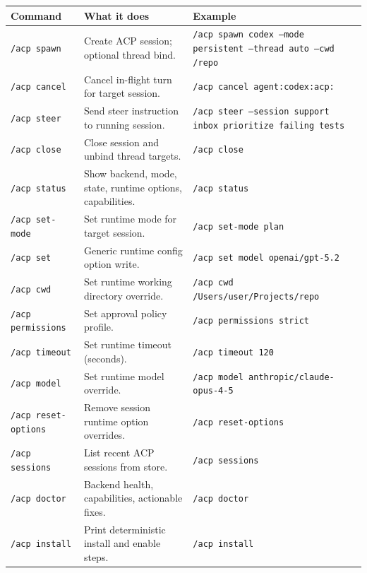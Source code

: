 \begin{table}[h]
\centering
\small
\begin{tabular}{|l|l|l|}
\hline
Command & What it does & Example \\
\hline
\texttt{/acp spawn} & Create ACP session; optional thread bind. & \texttt{/acp spawn codex --mode persistent --thread auto --cwd /repo} \\
\hline
\texttt{/acp cancel} & Cancel in-flight turn for target session. & \texttt{/acp cancel agent:codex:acp:} \\
\hline
\texttt{/acp steer} & Send steer instruction to running session. & \texttt{/acp steer --session support inbox prioritize failing tests} \\
\hline
\texttt{/acp close} & Close session and unbind thread targets. & \texttt{/acp close} \\
\hline
\texttt{/acp status} & Show backend, mode, state, runtime options, capabilities. & \texttt{/acp status} \\
\hline
\texttt{/acp set-mode} & Set runtime mode for target session. & \texttt{/acp set-mode plan} \\
\hline
\texttt{/acp set} & Generic runtime config option write. & \texttt{/acp set model openai/gpt-5.2} \\
\hline
\texttt{/acp cwd} & Set runtime working directory override. & \texttt{/acp cwd /Users/user/Projects/repo} \\
\hline
\texttt{/acp permissions} & Set approval policy profile. & \texttt{/acp permissions strict} \\
\hline
\texttt{/acp timeout} & Set runtime timeout (seconds). & \texttt{/acp timeout 120} \\
\hline
\texttt{/acp model} & Set runtime model override. & \texttt{/acp model anthropic/claude-opus-4-5} \\
\hline
\texttt{/acp reset-options} & Remove session runtime option overrides. & \texttt{/acp reset-options} \\
\hline
\texttt{/acp sessions} & List recent ACP sessions from store. & \texttt{/acp sessions} \\
\hline
\texttt{/acp doctor} & Backend health, capabilities, actionable fixes. & \texttt{/acp doctor} \\
\hline
\texttt{/acp install} & Print deterministic install and enable steps. & \texttt{/acp install} \\
\hline
\end{tabular}
\end{table}



